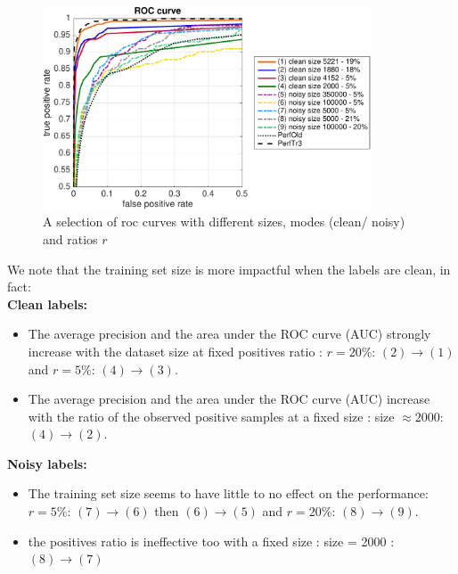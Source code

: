 \documentclass[a4paper]{article}
\begin{document}
            \begin{figure}[H]
                \centering
                \includegraphics[height=6cm]{exp1/roc_size}
                \caption{A selection of roc curves with different sizes, modes (clean/ noisy) and ratios $r$\label{rocsize}}
            \end{figure}
            We note that the training set size is more impactful when the labels are clean, in fact:\\
            \textbf{Clean labels:}
            \begin{itemize}
            \item The average precision and the area under the ROC curve (AUC) strongly increase with the dataset size at fixed positives ratio : $r=20\%$: $(2)\rightarrow (1)$ and  $r=5\%$: $(4)\rightarrow (3)$.
            \item The average precision and the area under the ROC curve (AUC) increase with the ratio of the observed positive samples at a fixed size : size $\approx 2000$: $(4)\rightarrow (2)$.
            \end{itemize}
            \textbf{Noisy labels:}
            \begin{itemize}
            \item The training set size seems to have little to no effect on the performance:  $r=5\%$: $(7)\rightarrow (6)$ then $(6)\rightarrow (5)$ and $r=20\%$: $(8)\rightarrow (9)$.
            \item the positives ratio is ineffective too with a fixed size : size = 2000 : $(8)\rightarrow (7)$
            \end{itemize}
            
\end{document}

